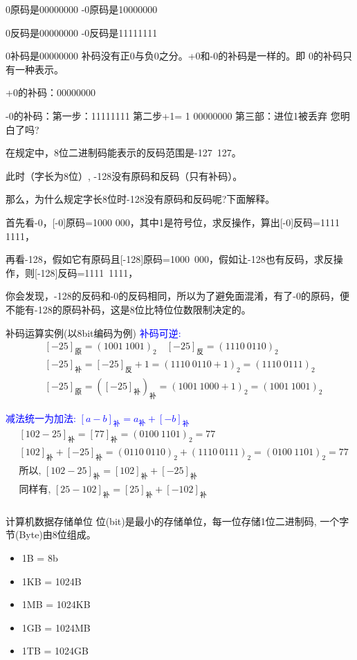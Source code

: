 \note
{
0原码是00000000 -0原码是10000000

0反码是00000000 -0反码是11111111

0补码是00000000 补码没有正0与负0之分。+0和-0的补码是一样的。即 0的补码只有一种表示。

+0的补码：00000000

-0的补码：第一步：11111111 第二步+1= 1 00000000 第三部：进位1被丢弃 您明白了吗?

在规定中，8位二进制码能表示的反码范围是-127~127。

此时（字长为8位）, -128没有原码和反码（只有补码）。

那么，为什么规定字长8位时-128没有原码和反码呢?下面解释。

首先看-0，[-0]原码=1000 000，其中1是符号位，求反操作，算出[-0]反码=1111 1111，

再看-128，假如它有原码且[-128]原码=1000~000，假如让-128也有反码，求反操作，则[-128]反码=1111~1111，

你会发现，-128的反码和-0的反码相同，所以为了避免面混淆，有了-0的原码，便不能有-128的原码补码，这是8位比特位位数限制决定的。
}

\begin{frame}{补码运算实例(以8bit编码为例)}
\textcolor{blue}{补码可逆:}
\begin{align*}
&[-25]_{\text{原}}=(1001~1001)_2\quad [-25]_{\text{反}}=(1110~0110)_2\\
&[-25]_{\text{补}}=[-25]_{\text{反}}+1=(1110~0110+1)_2=(1110~0111)_2\\
&[-25]_{\text{原}}=\left([-25]_{\text{补}}\right)_{\text{补}}=(1001~1000+1)_2=(1001~1001)_2
\end{align*}

\textcolor{blue}{减法统一为加法: $[a-b]_{\text{补}}=a_{\text{补}}+[-b]_{\text{补}}$}
\begin{align*}
&[102-25]_{\text{补}}=[77]_{\text{补}}=(0100~1101)_2=77\\
&[102]_{\text{补}}+[-25]_{\text{补}}=(0110~0110)_2+(1110~0111)_2=(0100~1101)_2=77\\
&\text{所以, }[102-25]_{\text{补}}=[102]_{\text{补}}+[-25]_{\text{补}}\\
&\text{同样有, }[25-102]_{\text{补}}=[25]_{\text{补}}+[-102]_{\text{补}}\\
\end{align*}
\end{frame}

\begin{frame}{计算机数据存储单位}
位(bit)是最小的存储单位，每一位存储1位二进制码, 一个字节(Byte)由8位组成。
\begin{itemize}
	\item 1B = 8b
	\item 1KB = 1024B
	\item 1MB = 1024KB
	\item 1GB = 1024MB
	\item 1TB = 1024GB
\end{itemize}
\end{frame}


